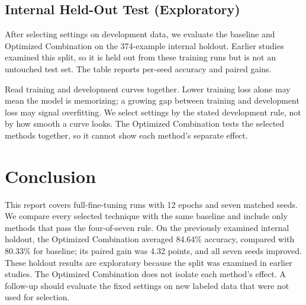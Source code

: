 \documentclass[letterpaper]{article}
\begin{document}

\subsection{Internal Held-Out Test (Exploratory)}
After selecting settings on development data, we evaluate the baseline and Optimized Combination on the 374-example internal holdout. Earlier studies examined this split, so it is held out from these training runs but is not an untouched test set. The table reports per-seed accuracy and paired gains.

Read training and development curves together. Lower training loss alone may mean the model is memorizing; a growing gap between training and development loss may signal overfitting. We select settings by the stated development rule, not by how smooth a curve looks. The Optimized Combination tests the selected methods together, so it cannot show each method's separate effect.

\section{Conclusion}
This report covers full-fine-tuning runs with 12 epochs and seven matched seeds. We compare every selected technique with the same baseline and include only methods that pass the four-of-seven rule. On the previously examined internal holdout, the Optimized Combination averaged 84.64\% accuracy, compared with 80.33\% for baseline; its paired gain was 4.32 points, and all seven seeds improved. These holdout results are exploratory because the split was examined in earlier studies. The Optimized Combination does not isolate each method's effect. A follow-up should evaluate the fixed settings on new labeled data that were not used for selection.
\end{document}
